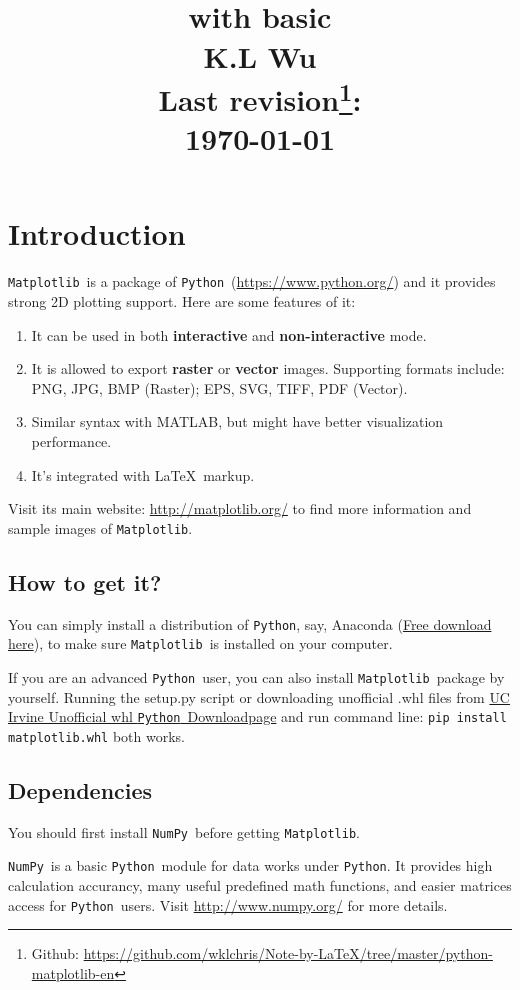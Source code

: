\documentclass{report}
\title{\flushright\framebox{\Huge Simple \mpl} \\[0.4ex]
with basic \NumPy \\[2.5ex]
\ttfamily K.L Wu \\[4ex]
\rmfamily\fontsize{12}{18}\selectfont
Last revision\footnote{Github: \url{https://github.com/wklchris/Note-by-LaTeX/tree/master/python-matplotlib-en}}: \\
\today
}
\author{}
\date{}
\newcommand{\pkg}[1]{\texttt{#1}}
\newcommand{\Py}{\pkg{Python}}
\newcommand{\NumPy}{\pkg{NumPy}}
\newcommand{\mpl}{\texttt{Matplotlib}}
\newcommand{\Emph}[1]{\textcolor{cyan!80!white}{{\bfseries #1}}}
\begin{document}
\maketitle

\tableofcontents

\chapter{Introduction}
\mpl\ is a package of \Py\ (\url{https://www.python.org/}) and it provides strong 2D plotting support. Here are some features of it:
\begin{enumerate}
\item It can be used in both \Emph{interactive} and \Emph{non-interactive} mode.
\item It is allowed to export \Emph{raster} or \Emph{vector} images. Supporting formats include: PNG, JPG, BMP (Raster); EPS, SVG, TIFF, PDF (Vector).
\item Similar syntax with MATLAB, but might have better visualization performance.
\item It's integrated with \LaTeX\ markup.
\end{enumerate}

Visit its main website: \url{http://matplotlib.org/} to find more information and sample images of \mpl .

\section{How to get it?}
You can simply install a distribution of \Py, say, Anaconda (\href{https://www.continuum.io/downloads}{Free download here}), to make sure \mpl\ is installed on your computer. 

If you are an advanced \Py\ user, you can also install \mpl\ package by yourself. Running the setup.py script or downloading unofficial .whl files from \href{http://www.lfd.uci.edu/~gohlke/pythonlibs/#matplotlib}{UC Irvine Unofficial whl \Py\ Downloadpage} and run command line: \texttt{pip install matplotlib.whl} both works.

\section{Dependencies}
You should first install \NumPy\ before getting \mpl .

\NumPy\ is a basic \Py\ module for data works under \Py . It provides high calculation accurancy, many useful predefined math functions, and easier matrices access for \Py\ users. Visit \url{http://www.numpy.org/} for more details.
\end{document}
